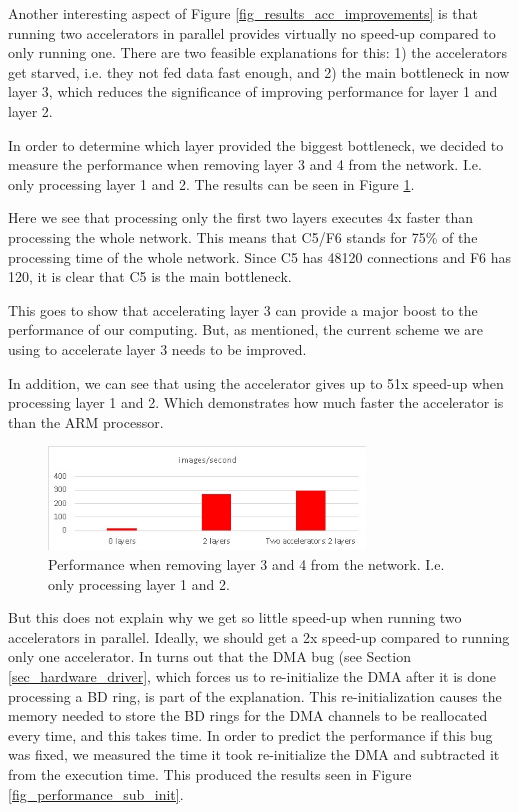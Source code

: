 Another interesting aspect of Figure \ref{fig_results_acc_improvements} is that running two accelerators in parallel provides virtually no speed-up compared to only running one. There are two feasible explanations for this: 1) the accelerators get starved, i.e. they not fed data fast enough, and 2) the main bottleneck in now layer 3, which reduces the significance of improving performance for layer 1 and layer 2.

In order to determine which layer provided the biggest bottleneck, we decided to measure the performance when removing layer 3 and 4 from the network. I.e. only processing layer 1 and 2. The results can be seen in Figure \ref{fig_performance_C1C2_only_accs}.

Here we see that processing only the first two layers executes 4x faster than processing the whole network. This means that C5/F6 stands for 75\% of the processing time of the whole network. Since C5 has 48120 connections and F6 has 120, it is clear that C5 is the main bottleneck. 

This goes to show that accelerating layer 3 can provide a major boost to the performance of our computing. But, as mentioned, the current scheme we are using to accelerate layer 3 needs to be improved.

In addition, we can see that using the accelerator gives up to 51x speed-up when processing layer 1 and 2. Which demonstrates how much faster the accelerator is than the ARM processor.

\begin{figure}[h!]
	\centering
	\includegraphics[width=0.75\textwidth]{Figures/Results/performance_C1C2_only_accs}
	\caption[Accelerator performance, layer 1 and 2]{Performance when removing layer 3 and 4 from the network. I.e. only processing layer 1 and 2.}
	\label{fig_performance_C1C2_only_accs}
\end{figure}

But this does not explain why we get so little speed-up when running two accelerators in parallel. Ideally, we should get a 2x speed-up compared to running only one accelerator. In turns out that the DMA bug (see Section \ref{sec_hardware_driver}, which forces us to re-initialize the DMA after it is done processing a BD ring, is part of the explanation. This re-initialization causes the memory needed to store the BD rings for the DMA channels to be reallocated every time, and this takes time. In order to predict the performance if this bug was fixed, we measured the time it took re-initialize the DMA and subtracted it from the execution time. This produced the results seen in Figure \ref{fig_performance_sub_init}.

